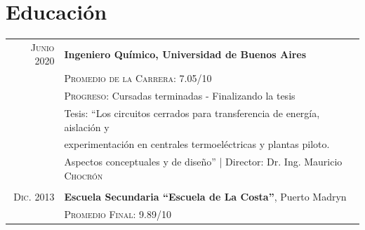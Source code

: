 \documentclass[a4paper,10pt]{article}
\begin{document}
\section{Educación}\smallskip
\begin{tabular}{rl}	
\textsc{Junio} 2020 & \textbf{Ingeniero Químico,  Universidad de Buenos Aires}\\
&\small\textsc{Promedio de la Carrera:} 7.05/10\\
&\small\textsc{Progreso:} Cursadas terminadas - Finalizando la tesis  \\
& Tesis: ``Los circuitos cerrados para transferencia de energía, aislación y\\& experimentación en centrales termoeléctricas y plantas piloto.\\& Aspectos conceptuales y de diseño'' | \small Director: Dr. Ing. Mauricio \textsc{Chocrón}\\\\
\textsc{Dic.} 2013& \textbf{Escuela Secundaria ``Escuela de La Costa''}, Puerto Madryn\\ &\small\textsc{Promedio Final:} 9.89/10
\end{tabular}\smallskip

\end{document}
